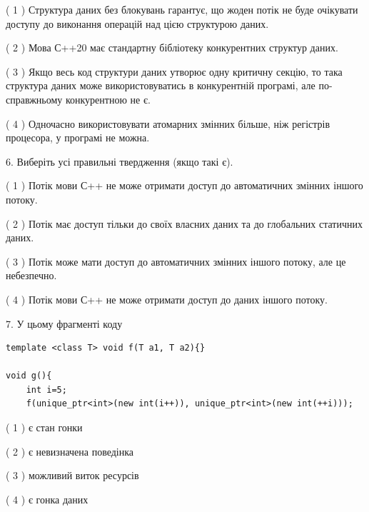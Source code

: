 \documentclass[12pt, ukrainian]{article}
\begin{document}
\begin {large}
{( 1 ) Структура даних без блокувань гарантує, що жоден потік не буде очікувати доступу до виконання операцій над цією структурою даних.%

( 2 ) Мова С++20 має стандартну бібліотеку конкурентних структур даних.%

( 3 ) Якщо весь код структури даних утворює одну критичну секцію, то така структура даних може використовуватись в конкурентній програмі, але по-справжньо\-му конкурентною не є.%

( 4 ) Одночасно використовувати атомарних змінних більше, ніж регістрів процесора, у програмі не можна.%
\newpage



\vspace{5mm}
6. Виберіть усі правильні твердження (якщо такі є).\par
\vspace{2mm}

( 1 ) Потік мови С++ не може отримати доступ до автоматичних змінних іншого потоку.%

( 2 ) Потік має доступ тільки до своїх власних даних та до глобальних статичних даних.%

( 3 ) Потік може мати доступ до автоматичних змінних іншого потоку, але це небезпечно.%

( 4 ) Потік мови С++ не може отримати доступ до даних іншого потоку.%


\vspace{5mm}
7. У цьому фрагменті коду
\begin{verbatim}
template <class T> void f(T a1, T a2){}

void g(){
    int i=5;
    f(unique_ptr<int>(new int(i++)), unique_ptr<int>(new int(++i)));
\end{verbatim}

( 1 ) є стан гонки%

( 2 ) є невизначена поведінка%

( 3 ) можливий виток ресурсів%

( 4 ) є гонка даних%
}
\end {large}
\end{document}

